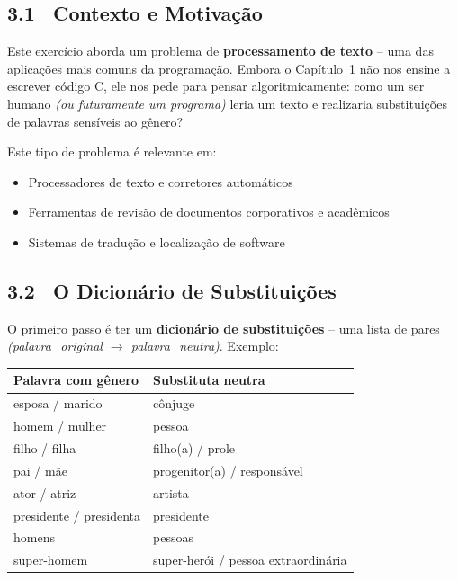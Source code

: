 \documentclass[12pt,a4paper]{article}
\begin{document}
\bigskip

\subsection*{3.1 \ Contexto e Motivação}

Este exercício aborda um problema de \textbf{processamento de texto} -- uma das
aplicações mais comuns da programação. Embora o Capítulo~1 não nos ensine a
escrever código C, ele nos pede para pensar algoritmicamente: como um ser humano
\textit{(ou futuramente um programa)} leria um texto e realizaria substituições
de palavras sensíveis ao gênero?

Este tipo de problema é relevante em:
\begin{itemize}
  \item Processadores de texto e corretores automáticos
  \item Ferramentas de revisão de documentos corporativos e acadêmicos
  \item Sistemas de tradução e localização de software
\end{itemize}

\bigskip

\subsection*{3.2 \ O Dicionário de Substituições}

O primeiro passo é ter um \textbf{dicionário de substituições} -- uma lista de pares
\textit{(palavra\_original $\to$ palavra\_neutra)}. Exemplo:

\begin{center}
\renewcommand{\arraystretch}{1.4}
\begin{tabular}{l l}
  \toprule
  \textbf{Palavra com gênero} & \textbf{Substituta neutra} \\ \midrule
  esposa / marido & cônjuge \\
  homem / mulher & pessoa \\
  filho / filha & filho(a) / prole \\
  pai / mãe & progenitor(a) / responsável \\
  ator / atriz & artista \\
  presidente / presidenta & presidente \\
  homens & pessoas \\
  super-homem & super-herói / pessoa extraordinária \\
  \bottomrule
\end{tabular}
\end{center}
\end{document}
